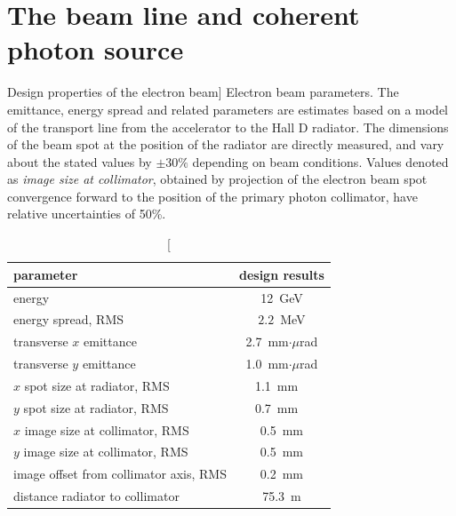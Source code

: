 \section[The beam line and coherent photon source]{The beam line and coherent photon source \label{sec:beamline}}

\begin{table}[tbp]
\begin{center}
\caption
[Design properties of the electron beam]
{Electron beam parameters. 
The emittance, energy spread and
related parameters are estimates
based on a model of the transport line from
the accelerator to the Hall D radiator.
The dimensions of the beam spot at the position of 
the radiator are directly measured, and vary about the
stated values by $\pm 30\%$
depending on beam conditions. Values
denoted as {\em image size at collimator},
obtained by projection of the electron beam
spot convergence forward to the position of
the primary photon collimator, have relative
uncertainties of 50\%.}
\label{tab:elecprop}
\begin{tabular}{|l|c|}
\hline\hline
parameter & design results \\
\hline
energy & 12~GeV \\
energy spread, RMS & $2.2$~MeV \\
transverse $x$ emittance & 2.7~mm$\cdot\mu$rad \\
transverse $y$ emittance & 1.0~mm$\cdot\mu$rad \\
$x$ spot size at radiator, RMS & 1.1~mm \ \\
$y$ spot size at radiator, RMS & 0.7~mm \ \\
$x$ image size at collimator, RMS & 0.5~mm \\
$y$ image size at collimator, RMS & 0.5~mm \\
image offset from collimator axis, RMS & 0.2~mm \\
distance radiator to collimator & 75.3~m \\
\hline\hline
\end{tabular}
\end{center}
\end{table}

